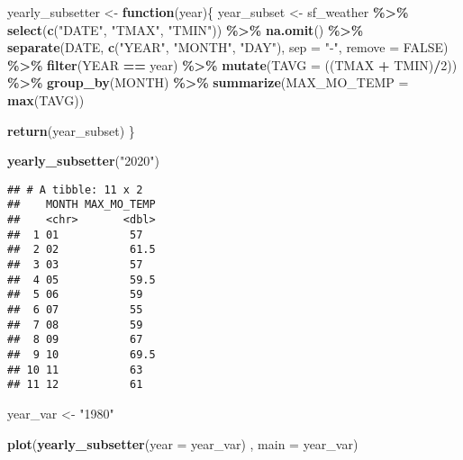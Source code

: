 \documentclass[
]{article}
\newenvironment{Shaded}{\begin{snugshade}}{\end{snugshade}}
\newcommand{\AttributeTok}[1]{\textcolor[rgb]{0.13,0.29,0.53}{#1}}
\newcommand{\ConstantTok}[1]{\textcolor[rgb]{0.56,0.35,0.01}{#1}}
\newcommand{\ControlFlowTok}[1]{\textcolor[rgb]{0.13,0.29,0.53}{\textbf{#1}}}
\newcommand{\DecValTok}[1]{\textcolor[rgb]{0.00,0.00,0.81}{#1}}
\newcommand{\FunctionTok}[1]{\textcolor[rgb]{0.13,0.29,0.53}{\textbf{#1}}}
\newcommand{\NormalTok}[1]{#1}
\newcommand{\OtherTok}[1]{\textcolor[rgb]{0.56,0.35,0.01}{#1}}
\newcommand{\SpecialCharTok}[1]{\textcolor[rgb]{0.81,0.36,0.00}{\textbf{#1}}}
\newcommand{\StringTok}[1]{\textcolor[rgb]{0.31,0.60,0.02}{#1}}
\begin{document}
\begin{Shaded}
\begin{Highlighting}[]
\NormalTok{yearly\_subsetter }\OtherTok{\textless{}{-}} \ControlFlowTok{function}\NormalTok{(year)\{}
\NormalTok{  year\_subset }\OtherTok{\textless{}{-}}\NormalTok{ sf\_weather }\SpecialCharTok{\%\textgreater{}\%} 
  \FunctionTok{select}\NormalTok{(}\FunctionTok{c}\NormalTok{(}\StringTok{"DATE"}\NormalTok{, }\StringTok{"TMAX"}\NormalTok{, }\StringTok{"TMIN"}\NormalTok{)) }\SpecialCharTok{\%\textgreater{}\%} 
  \FunctionTok{na.omit}\NormalTok{() }\SpecialCharTok{\%\textgreater{}\%} 
  \FunctionTok{separate}\NormalTok{(DATE, }\FunctionTok{c}\NormalTok{(}\StringTok{"YEAR"}\NormalTok{, }\StringTok{"MONTH"}\NormalTok{, }\StringTok{"DAY"}\NormalTok{), }\AttributeTok{sep =} \StringTok{"{-}"}\NormalTok{, }\AttributeTok{remove =} \ConstantTok{FALSE}\NormalTok{) }\SpecialCharTok{\%\textgreater{}\%} 
  \FunctionTok{filter}\NormalTok{(YEAR }\SpecialCharTok{==}\NormalTok{ year) }\SpecialCharTok{\%\textgreater{}\%} 
  \FunctionTok{mutate}\NormalTok{(}\AttributeTok{TAVG =}\NormalTok{ ((TMAX }\SpecialCharTok{+}\NormalTok{ TMIN)}\SpecialCharTok{/}\DecValTok{2}\NormalTok{)) }\SpecialCharTok{\%\textgreater{}\%} 
  \FunctionTok{group\_by}\NormalTok{(MONTH) }\SpecialCharTok{\%\textgreater{}\%} 
  \FunctionTok{summarize}\NormalTok{(}\AttributeTok{MAX\_MO\_TEMP =} \FunctionTok{max}\NormalTok{(TAVG))}
  
  \FunctionTok{return}\NormalTok{(year\_subset)}
\NormalTok{\}}

\FunctionTok{yearly\_subsetter}\NormalTok{(}\StringTok{"2020"}\NormalTok{)}
\end{Highlighting}
\end{Shaded}

\begin{verbatim}
## # A tibble: 11 x 2
##    MONTH MAX_MO_TEMP
##    <chr>       <dbl>
##  1 01           57  
##  2 02           61.5
##  3 03           57  
##  4 05           59.5
##  5 06           59  
##  6 07           55  
##  7 08           59  
##  8 09           67  
##  9 10           69.5
## 10 11           63  
## 11 12           61
\end{verbatim}

\begin{Shaded}
\begin{Highlighting}[]
\NormalTok{year\_var }\OtherTok{\textless{}{-}} \StringTok{"1980"}

\FunctionTok{plot}\NormalTok{(}\FunctionTok{yearly\_subsetter}\NormalTok{(}\AttributeTok{year =}\NormalTok{ year\_var) , }\AttributeTok{main =}\NormalTok{ year\_var)}
\end{Highlighting}
\end{Shaded}
\end{document}
